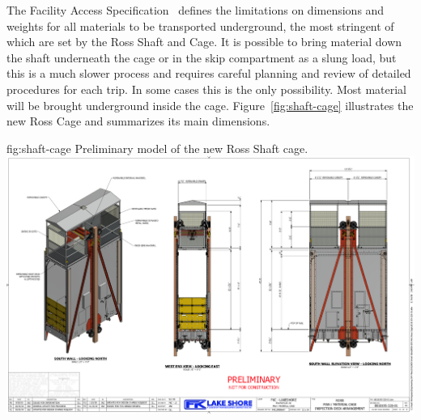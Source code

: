 The  Facility Access Specification~\cite{bib:docdb328} defines the limitations on dimensions and weights for all materials to be transported underground, the most stringent of which are set by the Ross Shaft and Cage.
It is possible to bring material down the shaft underneath the cage or in the skip compartment as a slung load, but this is a much slower process and requires careful planning and review of detailed procedures for each trip.
In some cases this is the only possibility.
Most material will be brought underground inside the cage.
Figure~\ref{fig:shaft-cage} illustrates the new Ross Cage and summarizes its main dimensions.
\begin{dunefigure}{fig:shaft-cage}
{Preliminary model of the new Ross Shaft cage.}
\includegraphics[width=1.\textwidth]{graphics/shaft-cage.png}
\end{dunefigure}

